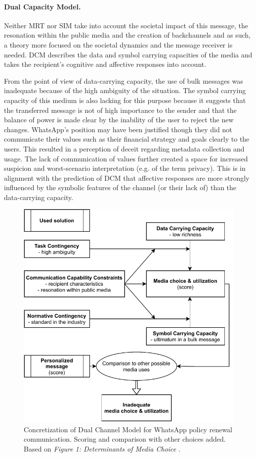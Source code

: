 \paragraph{Dual Capacity Model.}

Neither MRT nor SIM take into account the societal impact of this message, the resonation within the public media and the creation of backchannels and as such, a theory more focused on the societal dynamics and the message receiver is needed.
DCM describes the data and symbol carrying capacities of the media and takes the recipient's cognitive and affective responses into account.

From the point of view of data-carrying capacity, the use of bulk messages was inadequate because of the high ambiguity of the situation.
The symbol carrying capacity of this medium is also lacking for this purpose because it suggests that the transferred message is not of high importance to the sender and that the balance of power is made clear by the inability of the user to reject the new changes.
WhatsApp's position may have been justified though they did not communicate their values such as their financial strategy and goals clearly to the users.
This resulted in a perception of deceit regarding metadata collection and usage.
The lack of communication of values further created a space for increased suspicion and worst-scenario interpretation (e.g. of the term privacy).
This is in alignment with the prediction of DCM that affective responses are more strongly influenced by the symbolic features of the channel (or their lack of) than the data-carrying capacity.

\begin{figure}[ht]
\centering
\includegraphics[width=0.77\linewidth]{img/dcm_whatsapp_choice.pdf}
\caption{Concretization of Dual Channel Model for WhatsApp policy renewal communication. Scoring and comparison with other choices added. Based on \textit{Figure 1: Determinants of Media Choice} \citep{sitkin1992dual}.}
\label{fig:dcm_whatsapp_choice}
\end{figure}


